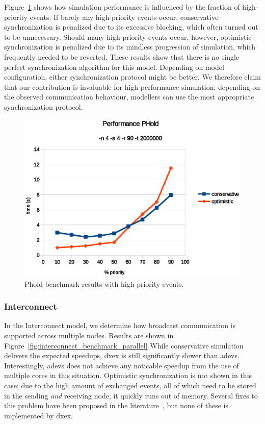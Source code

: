 Figure~\ref{fig:phold_priority} shows how simulation performance is influenced by the fraction of high-priority events.
If barely any high-priority events occur, conservative synchronization is penalized due to its excessive blocking, which often turned out to be unnecessary.
Should many high-priority events occur, however, optimistic synchronization is penalized due to its mindless progression of simulation, which frequently needed to be reverted.
These results show that there is no single perfect synchronization algorithm for this model.
Depending on model configuration, either synchronization protocol might be better.
We therefore claim that our contribution is invaluable for high performance simulation: depending on the observed communication behaviour, modellers can use the most appropriate synchronization protocol.

\begin{figure}
    \includegraphics[width=\columnwidth]{fig/phold_voorlopig.eps}
    \caption{Phold benchmark results with high-priority events.}
    \label{fig:phold_priority}
\end{figure}

\subsubsection{Interconnect}
In the Interconnect model, we determine how broadcast communication is supported across multiple nodes.
Results are shown in Figure~\ref{fig:interconnect_benchmark_parallel}
While conservative simulation delivers the expected speedups, dxex is still significantly slower than adevs.
Interestingly, adevs does not achieve any noticable speedup from the use of multiple cores in this situation.
Optimistic synchronization is not shown in this case: due to the high amount of exchanged events, all of which need to be stored in the sending \textit{and} receiving node, it quickly runs out of memory.
Several fixes to this problem have been proposed in the literature~\cite{FujimotoBook}, but none of these is implemented by dxex.

